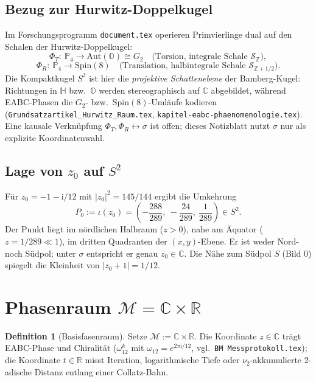 \documentclass[11pt,a4paper]{article}
\theoremstyle{definition}
\newtheorem{definition}{Definition}[section]
\theoremstyle{remark}
\newcommand{\R}{\mathbb{R}}
\newcommand{\C}{\mathbb{C}}
\newcommand{\vii}{\nu_2}
\newcommand{\omegaT}{\omega_{12}}
\begin{document}
\subsection{Bezug zur Hurwitz-Doppelkugel}

Im Forschungsprogramm \texttt{document.tex} operieren Primvierlinge
dual auf den Schalen der Hurwitz-Doppelkugel:
\[
\Phi_T:\ \mathbb{P}_4\to \mathrm{Aut}(\mathbb{O})\cong G_2
\quad\text{(Torsion, integrale Schale $\mathcal{S}_{\mathbb{Z}}$)},
\]
\[
\Phi_R:\ \mathbb{P}_4\to \mathrm{Spin}(8)
\quad\text{(Translation, halbintegrale Schale $\mathcal{S}_{\mathbb{Z}+1/2}$)}.
\]
Die Kompaktkugel $S^2$ ist hier die \emph{projektive Schattenebene}
der Bamberg-Kugel: Richtungen in $\mathbb{H}$ bzw.\ $\mathbb{O}$
werden stereographisch auf $\C$ abgebildet, während EABC-Phasen die
$G_2$- bzw.\ Spin$(8)$-Umläufe kodieren
(\texttt{Grundsatzartikel\_Hurwitz\_Raum.tex}, \texttt{kapitel-eabc-phaenomenologie.tex}).
Eine kausale Verknüpfung $\Phi_T,\Phi_R\leftrightarrow\sigma$ ist
offen; dieses Notizblatt nutzt $\sigma$ nur als explizite
Koordinatenwahl.

\subsection{Lage von \texorpdfstring{$z_0$}{z0} auf \texorpdfstring{$S^2$}{S2}}

Für $z_0=-1-\mathrm{i}/12$ mit $|z_0|^2=145/144$ ergibt die Umkehrung
\[
P_0:=\iota(z_0)=\left(
  -\frac{288}{289},\
  -\frac{24}{289},\
  \frac{1}{289}
\right)\in S^2.
\]
Der Punkt liegt im nördlichen Halbraum ($z>0$), nahe am Äquator
($z=1/289\ll 1$), im dritten Quadranten der $(x,y)$-Ebene.
Er ist weder Nord- noch Südpol; unter $\sigma$ entspricht er genau
$z_0\in\C$. Die Nähe zum Südpol $S$ (Bild $0$) spiegelt die
Kleinheit von $|z_0+1|=1/12$.

\section{Phasenraum \texorpdfstring{$\mathcal{M}=\C\times\R$}{M=C×R}}

\begin{definition}[Basisfasenraum]
Setze $\mathcal{M}:=\C\times\R$. Die Koordinate $z\in\C$ trägt
EABC-Phase und Chiralität ($\omegaT^{k}$ mit
$\omegaT=e^{2\pi\mathrm{i}/12}$, vgl.\ \texttt{BM Messprotokoll.tex});
die Koordinate $t\in\R$ misst Iteration, logarithmische Tiefe oder
$\vii$-akkumulierte 2-adische Distanz entlang einer Collatz-Bahn.
\end{definition}
\end{document}

